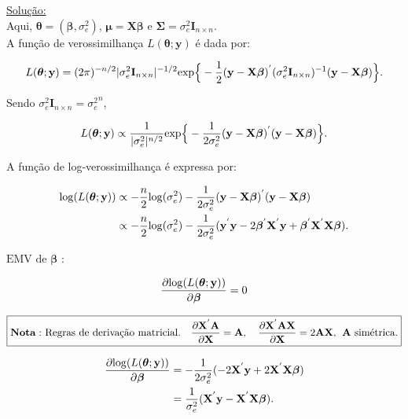 \documentclass[12pt, oldfontcommands]{article}\usepackage[]{graphicx}\usepackage[]{color}
\begin{document}
\underline{Solução:} \\

Aqui, \(\bm{\theta} = (\bm{\beta}, \sigma_{e}^{2})\),
\(\bm{\mu} = \mathbf{X} \bm{\beta}\) e
\(\bm{\Sigma} = \sigma_{e}^{2}\mathbf{I}_{n \times n}\). \\

A função de verossimilhança \(L(\bm{\theta}; \mathbf{y})\) é dada por:

\[ L(\bm{\theta}; \mathbf{y}) = (2 \pi)^{-n/2}
   |\sigma_{e}^{2}\mathbf{I}_{n \times n}|^{-1/2} {\rm exp}\Big\{
   -\frac{1}{2}
   (\mathbf{y} - \mathbf{X} \bm{\beta})^{'}
   (\sigma_{e}^{2}\mathbf{I}_{n \times n})^{-1}
   (\mathbf{y} - \mathbf{X} \bm{\beta})\Big\}. \]

Sendo \(\sigma_{e}^{2}\mathbf{I}_{n \times n} = {\sigma_{e}^{2}}^{n}\),

\[ L(\bm{\theta}; \mathbf{y}) \propto \frac{1}{|\sigma_{e}^{2}|^{n/2}}
   {\rm exp}\Big\{-\frac{1}{2\sigma_{e}^{2}}
   (\mathbf{y} - \mathbf{X} \bm{\beta})^{'}
   (\mathbf{y} - \mathbf{X} \bm{\beta})\Big\}. \]

A função de log-verossimilhança é expressa por:

\begin{align*}
 {\rm log}(L(\bm{\theta}; \mathbf{y})) & \propto -\frac{n}{2}
 {\rm log}(\sigma_{e}^{2}) -\frac{1}{2\sigma_{e}^{2}}
 (\mathbf{y} - \mathbf{X} \bm{\beta})^{'}
 (\mathbf{y} - \mathbf{X} \bm{\beta}) \\ & \propto -\frac{n}{2}
 {\rm log}(\sigma_{e}^{2}) -\frac{1}{2\sigma_{e}^{2}}
 (\mathbf{y}^{'}\mathbf{y} - 2\bm{\beta}^{'}\mathbf{X}^{'}\mathbf{y} +
 \bm{\beta}^{'}\mathbf{X}^{'}\mathbf{X}\bm{\beta}).
\end{align*}

\(\boxed{\text{EMV de } \bm{\beta}}\) :

\[ \frac{\partial
   {\rm log}(L(\bm{\theta}; \mathbf{y}))}{\partial \bm{\beta}} = 0 \]

\[
\boxed{
 \mathbf{Nota:} \text{ Regras de derivação matricial.} \quad
 \frac{\partial \mathbf{X}^{'}\mathbf{A}}{\partial \mathbf{X}} =
 \mathbf{A}, \quad
 \frac{\partial \mathbf{X}^{'}\mathbf{A}\mathbf{X}}{\partial \mathbf{X}}
 = 2\mathbf{A}\mathbf{X}, \hspace{.15cm} \mathbf{A} \text{ simétrica}.
}
\]

\begin{align*}
 \frac{\partial
 {\rm log}(L(\bm{\theta}; \mathbf{y}))}{\partial \bm{\beta}} & =
 -\frac{1}{2\sigma_{e}^{2}} (-2\mathbf{X}^{'}\mathbf{y} +
 2\mathbf{X}^{'}\mathbf{X}\bm{\beta}) \\ & = \frac{1}{\sigma_{e}^{2}}
 (\mathbf{X}^{'}\mathbf{y} - \mathbf{X}^{'}\mathbf{X}\bm{\beta}).
\end{align*}
\end{document}
